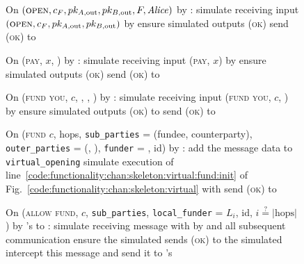 \begin{figure}[H]
  \begin{simulatorbox}{\simulator}
    \begin{algorithmic}[1]
      \State On $(\textsc{open}, c_F, pk_{A, \mathrm{out}}, pk_{B,
      \mathrm{out}}, F, \mathit{Alice})$ by \fchan:
      \Indent
        \State simulate \alice receiving input $(\textsc{open}, c_F, pk_{A,
        \mathrm{out}}, pk_{B, \mathrm{out}})$ by \environment
        \State ensure simulated \alice outputs (\textsc{ok})
        \State send (\textsc{ok}) to \fchan
      \EndIndent
      \Statex

      \State On (\textsc{pay}, $x$, \dave) by \fchan:
      \Indent
        \State simulate \dave receiving input (\textsc{pay}, $x$) by \environment
        \State ensure simulated \dave outputs (\textsc{ok})
        \State send (\textsc{ok}) to \fchan
      \EndIndent
      \Statex

      \State On (\textsc{fund you}, $c$, \bob, \charlie, \alice) by \fchan:
      \Indent
        \State simulate \alice receiving input (\textsc{fund you}, $c$, \bob) by
        \charlie
        \State ensure simulated \alice outputs (\textsc{ok}) to \charlie
        \State send (\textsc{ok}) to \fchan
      \EndIndent
      \Statex

      \State On (\textsc{fund} $c$, hops, \texttt{sub\_parties} = (fundee,
      counterparty), \texttt{outer\_parties} = (\charlie, \dave),
      \texttt{funder} = \alice, id) by \fchan:
      \label{code:simulator:fund}
      \Indent
        \State add the message data to \texttt{virtual\_opening}
        \State simulate execution of
        line~\ref{code:functionality:chan:skeleton:virtual:fund:init} of
        Fig.~\ref{code:functionality:chan:skeleton:virtual} with \alice
        \State send (\textsc{ok}) to \fchan
        \label{code:simulator:fund:ok}
      \EndIndent
      \Statex

      \State On (\textsc{allow fund}, $c$, \texttt{sub\_parties},
      \texttt{local\_funder} = $L_i$, id, $i \overset{?}{=} |\mathrm{hops}|$) by
      \fchan's \alice to \charlie:
      \Indent
        \State simulate receiving message with \charlie by \alice and all
        subsequent communication
        \State ensure the simulated \charlie sends (\textsc{ok}) to the
        simulated \alice
        \State intercept this message and send it to \fchan's \alice
      \EndIndent
      \Statex


\end{algorithmic}
\end{simulatorbox}
\end{figure}
